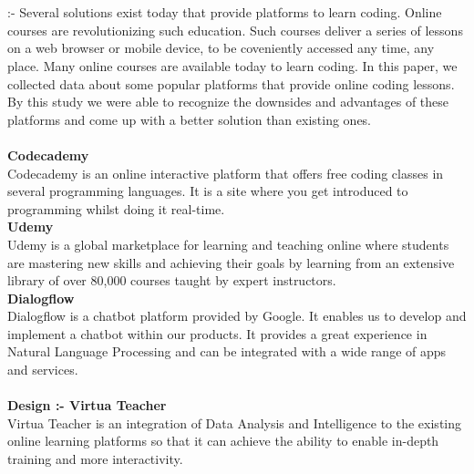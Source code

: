 




\chapter*{}
\hspace{0.1cm}{\bf Study} :- Several solutions exist today that provide platforms to learn coding. Online courses are revolutionizing such education. Such courses deliver a series of lessons on a web browser or mobile device, to be coveniently accessed any time, any place. Many online courses are available today to learn coding. In this paper, we collected data about some popular platforms that provide online coding lessons. By this study we were able to recognize the downsides and advantages of these platforms and come up with a better solution than existing ones.\\\\
{\bf Codecademy} \\
Codecademy is an online interactive platform that offers free coding classes in several programming languages. It is a site where you get introduced to programming whilst doing it real-time.\\
{\bf Udemy} \\
Udemy is a global marketplace for learning and teaching online where students are mastering new skills and achieving their goals by learning from an extensive library of over 80,000 courses taught by expert instructors. \\
{\bf Dialogflow} \\
Dialogflow is a chatbot platform provided by Google. It enables us to develop and implement a chatbot within our products. It provides a great experience in Natural Language Processing and can be integrated with a wide range of apps and services.\\\\
{\bf Design :- Virtua Teacher} \\
Virtua Teacher is an integration of Data Analysis and Intelligence to the existing online learning platforms so that it can achieve the ability to enable in-depth training and more interactivity.


